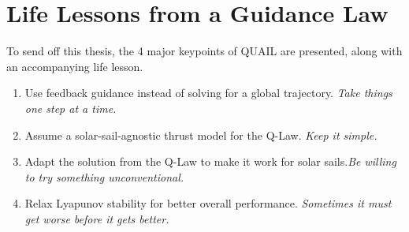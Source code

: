 \section{Life Lessons from a Guidance Law}
To send off this thesis, the 4 major keypoints of QUAIL are presented, along with an accompanying life lesson.

\begin{enumerate}
    \item Use feedback guidance instead of solving for a global trajectory. \newline \textit{Take things one step at a time.}
    \item Assume a solar-sail-agnostic thrust model for the Q-Law. \newline \textit{Keep it simple.}
    \item Adapt the solution from the Q-Law to make it work for solar sails.\newline \textit{Be willing to try something unconventional.}
    \item Relax Lyapunov stability for better overall performance. \newline \textit{Sometimes it must get worse before it gets better.}
\end{enumerate}